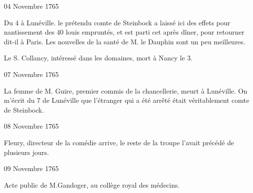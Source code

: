                      \begin{diary}{04 Novembre 1765}{}
                        
                         Du 4 à Lunéville. le
                              prétendu comte de
                              Steinbock a laissé ici des effets pour nantissement
                           des 40
                              louis empruntés, et est parti cet après
                           dîner, pour retourner dit-il à Paris. Les nouvelles
                           de la santé de M. le
                              Dauphin sont un peu meilleures. \bigskip
        
        
                        
                           Le S. Collancy, intéressé dans
                           les domaines,
                           mort à Nancy
                           le 3. \bigskip
        
        
                     \end{diary}

                     \begin{diary}{07 Novembre 1765}{}
                        
                        
                           La femme de M. Guire, premier
                           commis
                           de la chancellerie, meurt à Lunéville. On m'écrit du 7 de
                              Lunéville que l'étranger
                           qui a été arrêté était véritablement comte
                              de Steinbock. \bigskip
        
        
                     \end{diary}

                     \begin{diary}{08 Novembre 1765}{}
                        
                        
                           Fleury, directeur de la comédie arrive,
                           le reste de la troupe l'avait précédé de
                           plusieurs jours. \bigskip
        
        
                     \end{diary}

                     \begin{diary}{09 Novembre 1765}{}
                        
                         Acte public de M.Gandoger, au collège
                              royal des médecins. \bigskip
        
        
                     \end{diary}

